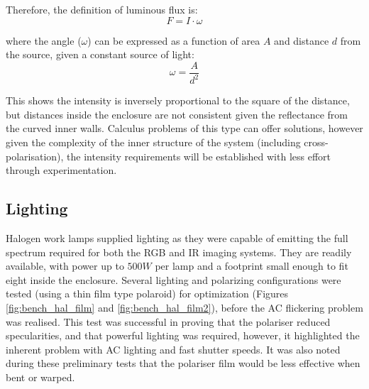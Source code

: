 \documentclass[fleqn,twoside,12pt]{report}
\begin{document}
Therefore, the definition of luminous flux is:
\begin{equation}
	F = I\cdot\omega
\end{equation}

where the angle ($\omega$) can be expressed as a function of area $A$ and distance $d$ from the source, given a constant source of light:
\begin{equation}
	\omega = \frac{A}{d^2}
\end{equation}

This shows the intensity is inversely proportional to the square of the distance, but distances inside the enclosure are not consistent given the reflectance from the curved inner walls. Calculus problems of this type can offer solutions, however given the complexity of the inner structure of the system (including cross-polarisation), the intensity requirements will be established with less effort through experimentation. 




\subsection{Lighting}
\label{sec:lighting}

Halogen work lamps supplied lighting as they were capable of emitting the full spectrum required for both the RGB and IR imaging systems. They are readily available, with power up to $500W$ per lamp and a footprint small enough to fit eight inside the enclosure. Several lighting and polarizing configurations were tested (using a thin film type polaroid) for optimization (Figures \ref{fig:bench_hal_film} and \ref{fig:bench_hal_film2}), before the AC flickering problem was realised. This test was successful in proving that the polariser reduced specularities, and that powerful lighting was required, however, it highlighted the inherent problem with AC lighting and fast shutter speeds. It was also noted during these preliminary tests that the polariser film would be less effective when bent or warped. 
\end{document}
